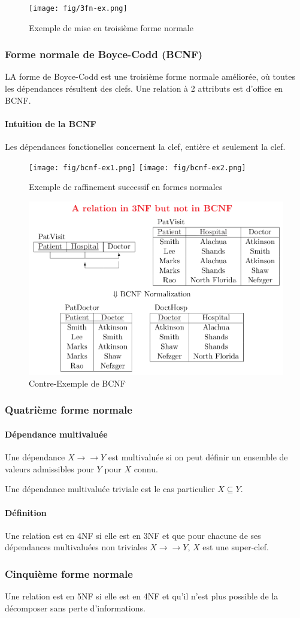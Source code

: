 \documentclass[a4paper]{article}
\begin{document}
\begin{figure}[H]
\center
\texttt{[image: fig/3fn-ex.png]}
\caption{Exemple de mise en troisième forme normale}
\end{figure}

\subsubsection{Forme normale de Boyce-Codd (BCNF)}
LA forme de Boyce-Codd est une troisième forme normale améliorée, où toutes les
dépendances résultent des clefs. Une relation à 2 attributs est d'office en
BCNF. 

\paragraph{Intuition de la BCNF} Les dépendances fonctionelles concernent la clef,
entière et seulement la clef.
\begin{figure}[H]
\center
\texttt{[image: fig/bcnf-ex1.png]}
\texttt{[image: fig/bcnf-ex2.png]}
\caption{Exemple de raffinement successif en formes normales}
\end{figure}

\begin{figure}[H]
\center
\includegraphics[width=.5\textwidth]{fig/bcnf-contre.png}
\caption{Contre-Exemple de BCNF}
\end{figure}

\subsubsection{Quatrième forme normale}
\paragraph{Dépendance multivaluée} Une dépendance $X \rightarrow\rightarrow Y$
est multivaluée si on peut définir un ensemble de valeurs admissibles pour $Y$
pour $X$ connu.

Une dépendance multivaluée triviale est le cas particulier $X \subseteq Y$.

\paragraph{Définition}
Une relation est en 4NF si elle est en 3NF et que pour chacune de ses
dépendances multivaluées non triviales $X \rightarrow\rightarrow Y$, $X$ est
une super-clef.

\subsubsection{Cinquième forme normale}
Une relation est en 5NF si elle est en 4NF et qu'il n'est plus possible de la
décomposer sans perte d'informations.
\end{document}
